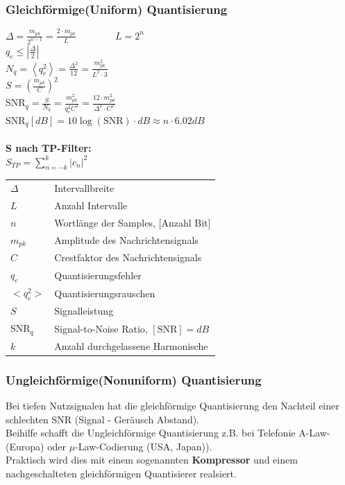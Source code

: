 \subsubsection{Gleichförmige(Uniform) Quantisierung}
\begin{multicols}{2}
	$ \Delta = \frac{m_{pk}}{2^{n-1}} = \frac{2 \cdot m_{pk}}{L} \qquad \qquad L =
	2^n$\\
	$q_e \leq |\frac{\Delta}{2}|$\\
	$ N_q = \left< q_e^2 \right> = \frac{\Delta^2}{12} =
	\frac{m_{pk}^2}{L^2 \cdot 3}$ \\
	$ S = \left( \frac{ m_{pk} }{C} \right)^2$ \\
	$ \text{SNR}_{q} =\frac{S}{N_q}=\frac{m_{pk}^2}{q_e^2C^2} = \frac{12\cdot m_{pk}^2}{\Delta^2\cdot C^2}$\\
	$\text{SNR}_{q} \left[dB\right] =10 \log(\text{SNR}) \cdot dB \approx n \cdot
	6.02dB$ \\ \\
	\textbf{S nach TP-Filter:}\\
	$S_{TP} = \sum\limits_{n=-k}^{k} |c_n|^2 $
\columnbreak

	\begin{tabular}{l l}
		$\Delta$ & Intervallbreite \\
		$L$ & Anzahl Intervalle \\
		$n$ & Wortlänge der Samples, [Anzahl Bit] \\
		$m_{pk}$ & Amplitude des Nachrichtensignals \\
		$C$ & Crestfaktor des Nachrichtensignals \\
		$q_e$ & Quantisierungsfehler \\
		$<q_e^2>$ & Quantisierungsrauschen \\
		$S$ & Signalleistung\\
		$\text{SNR}_{q}$ & Signal-to-Noise Ratio, $[\text{SNR}] = dB$ \\
		$k$ & Anzahl durchgelassene Harmonische
	\end{tabular}
\end{multicols}

\newpage
\subsubsection{Ungleichförmige(Nonuniform) Quantisierung }
Bei tiefen Nutzsignalen hat die gleichförmige Quantisierung den Nachteil einer schlechten SNR
(Signal - Geräusch Abstand). \\
Beihilfe schafft die Ungleichförmige Quantisierung z.B. bei Telefonie
A-Law-(Europa) oder $\mu$-Law-Codierung (USA, Japan)). \\
Praktisch wird dies mit einem sogenannten \textbf{Kompressor} und einem nachgeschalteten
gleichförmigen Quantisierer realsiert.

